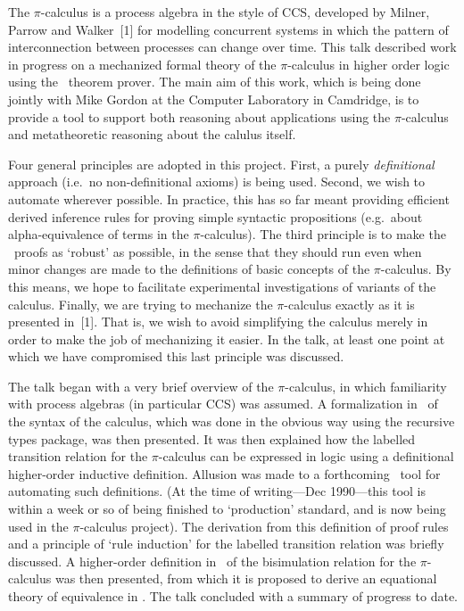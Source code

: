 \noindent The $\pi$-calculus is a process algebra in the style of CCS,
developed by Milner, Parrow and Walker~[1] for modelling concurrent systems in
which the pattern of interconnection between processes can change over time.
This talk described work in progress on a mechanized formal theory of the
$\pi$-calculus in higher order logic using the \HOL\ theorem prover.  The main
aim of this work, which is being done jointly with Mike Gordon at the Computer
Laboratory in Camdridge, is to provide a tool to support both reasoning about
applications using the $\pi$-calculus and metatheoretic reasoning about the
calulus itself.  

Four general principles are adopted in this project.  First, a purely {\it
definitional\/} approach (i.e.\ no non-definitional axioms) is being used.
Second, we wish to automate wherever possible.  In practice, this has so far
meant providing efficient derived inference rules for proving simple syntactic
propositions (e.g.\ about alpha-equivalence of terms in the $\pi$-calculus).
The third principle is to make the \HOL\ proofs as `robust' as possible, in
the sense that they should run even when minor changes are made to the
definitions of basic concepts of the $\pi$-calculus.  By this means, we hope
to facilitate experimental investigations of variants of the calculus.
Finally, we are trying to mechanize the $\pi$-calculus exactly as it is
presented in~[1].  That is, we wish to avoid simplifying the calculus merely
in order to make the job of mechanizing it easier.  In the talk, at least one
point at which we have compromised this last principle was discussed.

The talk began with a very brief overview of the $\pi$-calculus, in which
familiarity with process algebras (in particular CCS) was assumed.  A
formalization in \HOL\ of the syntax of the calculus, which was done in the
obvious way using the recursive types package, was then presented.  It was
then explained how the labelled transition relation for the $\pi$-calculus can
be expressed in logic using a definitional higher-order inductive definition.
Allusion was made to a forthcoming \HOL\ tool for automating such definitions.
(At the time of writing---Dec 1990---this tool is within a week or so of being
finished to `production' standard, and is now being used in the $\pi$-calculus
project).   The derivation from this definition of proof rules and a principle
of `rule induction' for the labelled transition relation was briefly
discussed.  A higher-order definition in \HOL\ of the bisimulation relation
for the $\pi$-calculus was then presented, from which it is proposed to derive
an equational theory of equivalence in \HOL.  The talk concluded with a
summary of progress to date.


